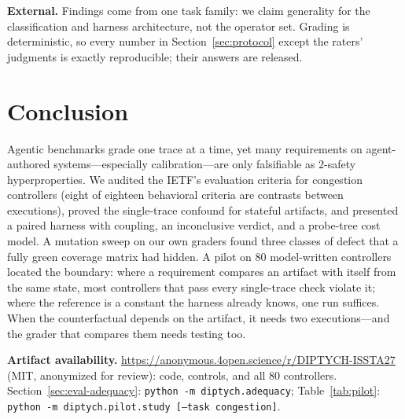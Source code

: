 \documentclass[sigconf,review,anonymous]{acmart}
\newcommand{\anonrepo}{\url{https://anonymous.4open.science/r/DIPTYCH-ISSTA27}}
\begin{document}
	\textbf{External.} Findings come from one task family: we claim
	generality for the classification and harness architecture, not the
	operator set. Grading is deterministic, so every number in
	Section~\ref{sec:protocol} except the raters' judgments is exactly
	reproducible; their answers are released.
	
	\section{Conclusion}
	\label{sec:conclusion}
	
	Agentic benchmarks grade one trace at a time, yet many requirements on
	agent-authored systems---especially calibration---are only falsifiable as
	$2$-safety hyperproperties. We audited the IETF's evaluation criteria for
	congestion controllers (eight of eighteen behavioral criteria are
	contrasts between executions), proved the single-trace
	confound for stateful artifacts, and presented a paired harness with
	coupling, an inconclusive verdict, and a probe-tree cost model. A mutation
	sweep on our own graders found three classes of defect that a fully green
	coverage matrix had hidden. A pilot on 80 model-written controllers
	located the boundary: where a requirement compares an artifact with
	itself from the same state, most controllers that pass every
	single-trace check violate it; where the reference is a constant the
	harness already knows, one run suffices. When the counterfactual depends
	on the artifact, it needs two executions---and the grader that compares
	them needs testing too.
	
	{\raggedright\textbf{Artifact availability.}
	\anonrepo{} (MIT, anonymized for review): code, controls, and all 80
	controllers. Section~\ref{sec:eval-adequacy}: \texttt{python -m
	diptych.adequacy}; Table~\ref{tab:pilot}: \texttt{python -m
	diptych.pilot.study [--task congestion]}.\par}
	
	
	
	
	
	
\end{document}

